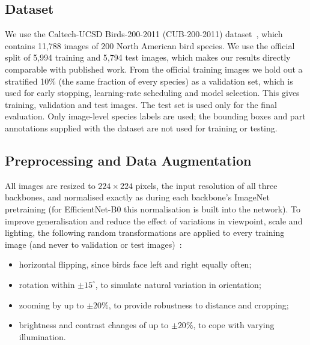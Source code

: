 \documentclass[conference]{IEEEtran}
\begin{document}
\subsection{Dataset}
We use the Caltech-UCSD Birds-200-2011 (CUB-200-2011) dataset~\cite{wah2011},
which contains 11,788 images of 200 North American bird species. We use the
official split of 5,994 training and 5,794 test images, which makes our results
directly comparable with published work. From the official training images we
hold out a stratified 10\% (the same fraction of every species) as a validation
set, which is used for early stopping, learning-rate scheduling and model
selection. This gives \NTrain{} training, \NVal{} validation and \NTest{} test
images. The test set is used only for the final evaluation. Only image-level species labels are
used; the bounding boxes and part annotations supplied with the dataset are not
used for training or testing.


\subsection{Preprocessing and Data Augmentation}\label{sec:aug}
All images are resized to $224\times224$ pixels, the input resolution of all three
backbones, and normalised exactly as during each backbone's ImageNet pretraining
(for EfficientNet-B0 this normalisation is built into the network). To improve
generalisation and reduce the effect of variations in viewpoint, scale and
lighting, the following random transformations are applied to every training
image (and never to validation or test images)~\cite{shorten2019}:
\begin{itemize}
\item horizontal flipping, since birds face left and right equally often;
\item rotation within $\pm15^\circ$, to simulate natural variation in orientation;
\item zooming by up to $\pm20\%$, to provide robustness to distance and cropping;
\item brightness and contrast changes of up to $\pm20\%$, to cope with varying illumination.
\end{itemize}
\end{document}
